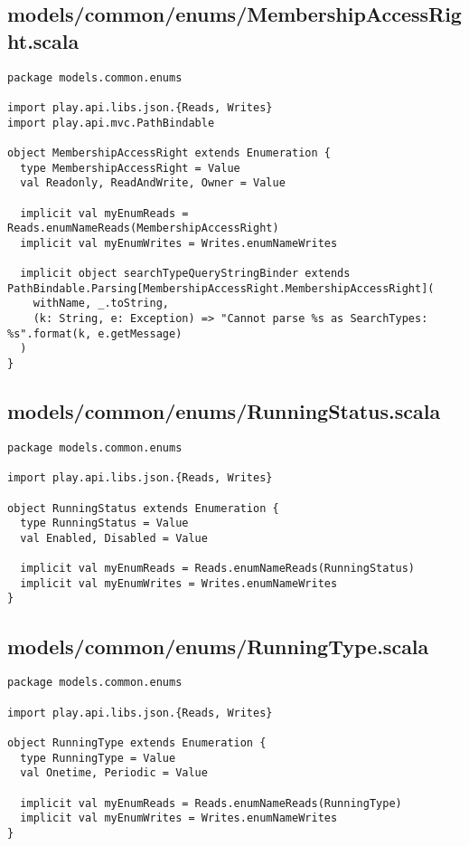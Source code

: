 \subsection{models/common/enums/MembershipAccessRight.scala}
\begin{lstlisting}
package models.common.enums

import play.api.libs.json.{Reads, Writes}
import play.api.mvc.PathBindable

object MembershipAccessRight extends Enumeration {
  type MembershipAccessRight = Value
  val Readonly, ReadAndWrite, Owner = Value

  implicit val myEnumReads = Reads.enumNameReads(MembershipAccessRight)
  implicit val myEnumWrites = Writes.enumNameWrites

  implicit object searchTypeQueryStringBinder extends PathBindable.Parsing[MembershipAccessRight.MembershipAccessRight](
    withName, _.toString,
    (k: String, e: Exception) => "Cannot parse %s as SearchTypes: %s".format(k, e.getMessage)
  )
}
\end{lstlisting}
\subsection{models/common/enums/RunningStatus.scala}
\begin{lstlisting}
package models.common.enums

import play.api.libs.json.{Reads, Writes}

object RunningStatus extends Enumeration {
  type RunningStatus = Value
  val Enabled, Disabled = Value

  implicit val myEnumReads = Reads.enumNameReads(RunningStatus)
  implicit val myEnumWrites = Writes.enumNameWrites
}
\end{lstlisting}
\subsection{models/common/enums/RunningType.scala}
\begin{lstlisting}
package models.common.enums

import play.api.libs.json.{Reads, Writes}

object RunningType extends Enumeration {
  type RunningType = Value
  val Onetime, Periodic = Value

  implicit val myEnumReads = Reads.enumNameReads(RunningType)
  implicit val myEnumWrites = Writes.enumNameWrites
}
\end{lstlisting}
